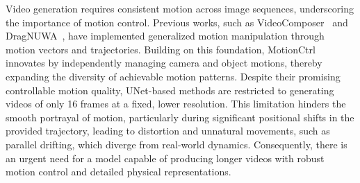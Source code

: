 Video generation requires consistent motion across image sequences, underscoring the importance of motion control. Previous works, such as VideoComposer~\cite{wang2023videocomposer} and DragNUWA~\cite{yin2023dragnuwa}, have implemented generalized motion manipulation through motion vectors and trajectories. Building on this foundation, MotionCtrl~\cite{wang2024motionctrl} innovates by independently managing camera and object motions, thereby expanding the diversity of achievable motion patterns. Despite their promising controllable motion quality, UNet-based methods are restricted to generating videos of only 16 frames at a fixed, lower resolution. This limitation hinders the smooth portrayal of motion, particularly during significant positional shifts in the provided trajectory, leading to distortion and unnatural movements, such as parallel drifting, which diverge from real-world dynamics. Consequently, there is an urgent need for a model capable of producing longer videos with robust motion control and detailed physical representations.

